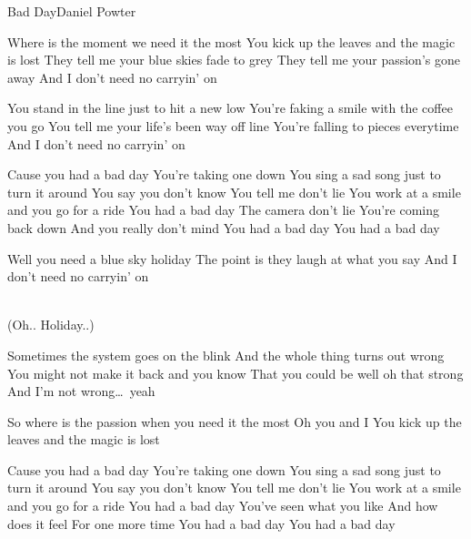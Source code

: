 \begin{Song}{Bad Day}{Daniel Powter}
\begin{multicols}{2}

\begin{Verse}
Where is the moment we need it the most
You kick up the leaves and the magic is lost
They tell me your blue skies fade to grey
They tell me your passion's gone away
And I don't need no carryin' on
\end{Verse}
\espaceInterStrophe

\begin{Verse}
You stand in the line just to hit a new low
You're faking a smile with the coffee you go
You tell me your life's been way off line
You're falling to pieces everytime
And I don't need no carryin' on
\end{Verse}
\espaceInterStrophe

\begin{Chorus}
Cause you had a bad day
You're taking one down
You sing a sad song just to turn it around
You say you don't know
You tell me don't lie
You work at a smile and you go for a ride
You had a bad day
The camera don't lie
You're coming back down
And you really don't mind
You had a bad day
You had a bad day
\end{Chorus}
\espaceInterStrophe

\begin{Verse}
Well you need a blue sky holiday
The point is they laugh at what you say
And I don't need no carryin' on
\end{Verse}
\columnbreak

\\
(Oh.. Holiday..)
\espaceInterStrophe

\begin{Bridge}
Sometimes the system goes on the blink
And the whole thing turns out wrong
You might not make it back and you know
That you could be well oh that strong
And I'm not wrong\dots\ yeah
\end{Bridge}
\espaceInterStrophe

\begin{Verse}
So where is the passion when you need it the most
Oh you and I
You kick up the leaves and the magic is lost
\end{Verse}
\espaceInterStrophe

\begin{Chorus}
Cause you had a bad day
You're taking one down
You sing a sad song just to turn it around
You say you don't know
You tell me don't lie
You work at a smile and you go for a ride
You had a bad day
You've seen what you like
And how does it feel
For one more time
You had a bad day
You had a bad day
\end{Chorus}
\vfill
~


\end{multicols}
\end{Song}
